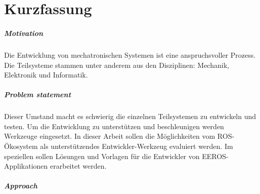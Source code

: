 \chapter*{Kurzfassung}


\paragraph*{Motivation}

Die Entwicklung von mechatronischen Systemen ist eine anspruchsvoller Prozess.
Die Teilsysteme stammen unter anderem aus den Disziplinen: Mechanik, Elektronik und Informatik.



\paragraph*{Problem statement}

Dieser Umstand macht es schwierig die einzelnen Teilsystemen zu entwickeln und testen.
Um die Entwicklung zu unterstützen und beschleunigen werden Werkzeuge eingesetzt.
In dieser Arbeit sollen die Möglichkeiten vom ROS-Ökosystem als unterstützendes Entwickler-Werkzeug evaluiert werden.
Im speziellen sollen Lösungen und Vorlagen für die Entwickler von EEROS-Applikationen erarbeitet werden.

\paragraph*{Approach}

